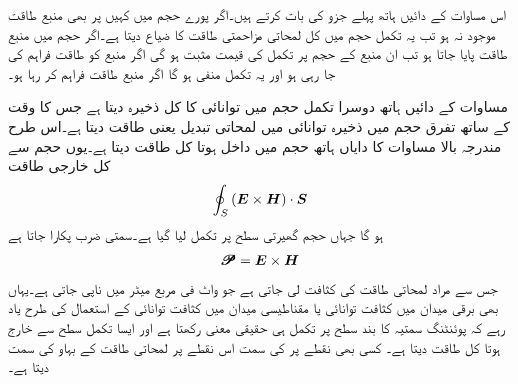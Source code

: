 اس مساوات کے دائیں ہاتھ پہلے جزو کی بات کرتے ہیں۔اگر پورے حجم میں کہیں پر بھی منبع طاقت موجود نہ ہو تب یہ تکمل حجم میں کل لمحاتی مزاحمتی طاقت  کا ضیاع دیتا ہے۔اگر حجم میں منبع طاقت پایا جاتا ہو تب ان منبع کے حجم  پر تکمل کی قیمت مثبت ہو گی اگر منبع کو طاقت فراہم کی جا رہی ہو اور یہ تکمل منفی ہو گا اگر منبع طاقت فراہم کر رہا ہو۔

مساوات کے دائیں ہاتھ دوسرا تکمل حجم میں توانائی کا کل ذخیرہ دیتا ہے جس کا وقت کے ساتھ تفرق حجم میں ذخیرہ توانائی میں لمحاتی تبدیل یعنی طاقت دیتا ہے۔اس طرح مندرجہ بالا مساوات کا دایاں ہاتھ حجم میں داخل ہوتا کل طاقت دیتا ہے۔یوں حجم سے کل خارجی طاقت 
\begin{align*}
\oint_S \left({{\boldsymbol{E}}} \times {\ensuremath{{\boldsymbol{H}}}} \right) \cdot {\ensuremath{{\boldsymbol{S}}}}
\end{align*}
ہو گا جہاں حجم گھیرتی سطح پر تکمل لیا گیا ہے۔سمتی ضرب    پکارا جاتا ہے
\begin{align}
\pmb{\mathscr{P}}={{\boldsymbol{E}}} \times {\ensuremath{{\boldsymbol{H}}}}
\end{align}
جس سے مراد لمحاتی طاقت کی کثافت لی جاتی ہے جو واٹ فی مربع میٹر  میں ناپی جاتی ہے۔یہاں بھی برقی میدان میں کثافت توانائی  یا مقناطیسی میدان میں کثافت توانائی  کے استعمال کی طرح یاد رہے کہ پوئنٹنگ سمتیہ کا بند سطح پر  تکمل ہی حقیقی معنی رکھتا ہے اور ایسا تکمل سطح سے خارج ہوتا کل طاقت دیتا ہے۔ کسی بھی نقطے پر  کی سمت اس نقطے پر لمحاتی طاقت کے بہاو کی سمت دیتا ہے۔


